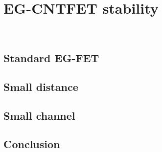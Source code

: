 \chapter{EG-CNTFET stability}
\label{cap:chapter3}

\newpage
\thispagestyle{empty}
\ %
\newpage


\section{Standard EG-FET}
\label{sec:big_channel}




\section{Small distance}
\label{sec:small_distance}




\section{Small channel}
\label{sec:small_channel}




\section{Conclusion}
\label{sec:stability_conclusion}


\newpage
\thispagestyle{empty}
\ %
\newpage
